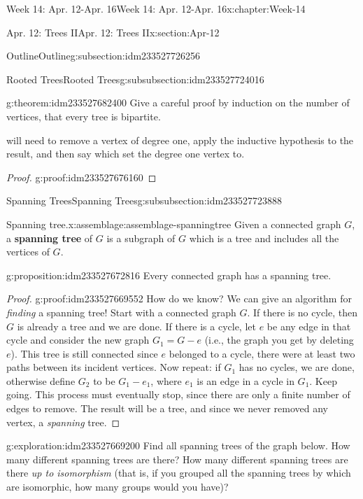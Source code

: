 \documentclass[oneside,10pt,]{book}
\newcommand{\terminology}[1]{\textbf{#1}}
\numberwithin{equation}{section}
\begin{document}
\begin{chapterptx}{Week 14: Apr. 12-Apr. 16}{}{Week 14: Apr. 12-Apr. 16}{}{}{x:chapter:Week-14}
\begin{sectionptx}{Apr. 12: Trees II}{}{Apr. 12: Trees II}{}{}{x:section:Apr-12}
\begin{subsectionptx}{Outline}{}{Outline}{}{}{g:subsection:idm233527726256}
\begin{subsubsectionptx}{Rooted Trees}{}{Rooted Trees}{}{}{g:subsubsection:idm233527724016}
\begin{theorem}{}{}{g:theorem:idm233527682400}%
Give a careful proof by induction on the number of vertices, that every tree is bipartite.%
\par\smallskip%
\noindentYou will need to remove a vertex of degree one, apply the inductive hypothesis to the result, and then say which set the degree one vertex to.%
\end{theorem}
\begin{proof}{}{g:proof:idm233527676160}
\end{proof}
\end{subsubsectionptx}
%
%
\typeout{************************************************}
\typeout{************************************************}
%
\begin{subsubsectionptx}{Spanning Trees}{}{Spanning Trees}{}{}{g:subsubsection:idm233527723888}
\begin{assemblage}{Spanning tree.}{x:assemblage:assemblage-spanningtree}%
Given a connected graph \(G\), a \terminology{spanning tree} of \(G\) is a subgraph of \(G\) which is a tree and includes all the vertices of \(G\).%
\end{assemblage}
\begin{proposition}{}{}{g:proposition:idm233527672816}%
Every connected graph has a spanning tree.%
\end{proposition}
\begin{proof}{}{g:proof:idm233527669552}
How do we know?  We can give an algorithm for \emph{finding} a spanning tree!  Start with a connected graph \(G\).  If there is no cycle, then \(G\) is already a tree and we are done.  If there is a cycle, let \(e\) be any edge in that cycle and consider the new graph \(G_1 = G - e\) (i.e., the graph you get by deleting \(e\)).  This tree is still connected since \(e\) belonged to a cycle, there were at least two paths between its incident vertices.  Now repeat: if \(G_1\) has no cycles, we are done, otherwise define \(G_2\) to be \(G_1 - e_1\), where \(e_1\) is an edge in a cycle in \(G_1\).  Keep going.  This process must eventually stop, since there are only a finite number of edges to remove.  The result will be a tree, and since we never removed any vertex, a \emph{spanning} tree.%
\end{proof}
\begin{exploration}{}{g:exploration:idm233527669200}%
Find all spanning trees of the graph below. How many different spanning trees are there? How many different spanning trees are there \emph{up to isomorphism} (that is, if you grouped all the spanning trees by which are isomorphic, how many groups would you have)?%

\end{exploration}
\end{subsubsectionptx}
\end{subsectionptx}
\end{sectionptx}
\end{chapterptx}
\end{document}
